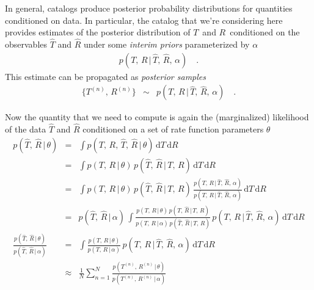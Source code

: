 \documentclass[12pt,preprint]{aastex}
\newcommand{\dd}{\ensuremath{\,\mathrm{d}}}
\newcommand{\ratepars}{\ensuremath{\theta}}
\newcommand{\obs}[1]{\ensuremath{\hat{#1}}}
\newcommand{\radius}{\ensuremath{R}}
\newcommand{\period}{\ensuremath{T}}
\newcommand{\interim}{\ensuremath{\alpha}}
\begin{document}
In general, catalogs produce posterior probability distributions for
quantities conditioned on data.
In particular, the catalog that we're considering here provides estimates of
the posterior distribution of \period\ and \radius\ conditioned on the
observables $\obs{\period}$ and $\obs{\radius}$ under some \emph{interim
priors} parameterized by \interim
\begin{eqnarray}
p(\period,\,\radius\,|\,\obs{\period},\,\obs{\radius},\,\interim) \quad.
\end{eqnarray}
This estimate can be propagated as \emph{posterior samples}
\begin{eqnarray}
\{\period^{(n)},\,\radius^{(n)}\} &\sim&
p(\period,\,\radius\,|\,\obs{\period},\,\obs{\radius},\,\interim) \quad.
\end{eqnarray}

Now the quantity that we need to compute is again the (marginalized)
likelihood of the data $\obs{\period}$ and $\obs{\radius}$ conditioned on a
set of rate function parameters \ratepars
\begin{eqnarray}
p(\obs{\period},\,\obs{\radius}\,|\,\ratepars) &=&
\int p(\period,\,\radius,\,\obs{\period},\,\obs{\radius}\,|\,\ratepars)
\dd\period\dd\radius \\
&=&
\int p(\period,\,\radius\,|\,\ratepars) \,
p(\obs{\period},\,\obs{\radius}\,|\,\period,\,\radius)
\dd\period\dd\radius \\
&=&
\int p(\period,\,\radius\,|\,\ratepars) \,
p(\obs{\period},\,\obs{\radius}\,|\,\period,\,\radius)\,
\frac{p(\period,\,\radius\,|\,\obs{\period},\,\obs{\radius},\,\interim)}
     {p(\period,\,\radius\,|\,\obs{\period},\,\obs{\radius},\,\interim)}
\dd\period\dd\radius \\
&=&
p(\obs{\period},\,\obs{\radius}\,|\,\interim)\,
\int
\frac{p(\period,\,\radius\,|\,\ratepars) \,
      p(\obs{\period},\,\obs{\radius}\,|\,\period,\,\radius)}
     {p(\period,\,\radius\,|\,\interim) \,
      p(\obs{\period},\,\obs{\radius}\,|\,\period,\,\radius)}\,
p(\period,\,\radius\,|\,\obs{\period},\,\obs{\radius},\,\interim)
\dd\period\dd\radius \\
\frac{p(\obs{\period},\,\obs{\radius}\,|\,\ratepars)}
     {p(\obs{\period},\,\obs{\radius}\,|\,\interim)}
&=&
\int
\frac{p(\period,\,\radius\,|\,\ratepars)}
     {p(\period,\,\radius\,|\,\interim)} \,
p(\period,\,\radius\,|\,\obs{\period},\,\obs{\radius},\,\interim)
\dd\period\dd\radius \\
&\approx&
\frac{1}{N}
\sum_{n=1}^N
\frac{p(\period^{(n)},\,\radius^{(n)}\,|\,\ratepars)}
     {p(\period^{(n)},\,\radius^{(n)}\,|\,\interim)}
\end{eqnarray}
\end{document}
